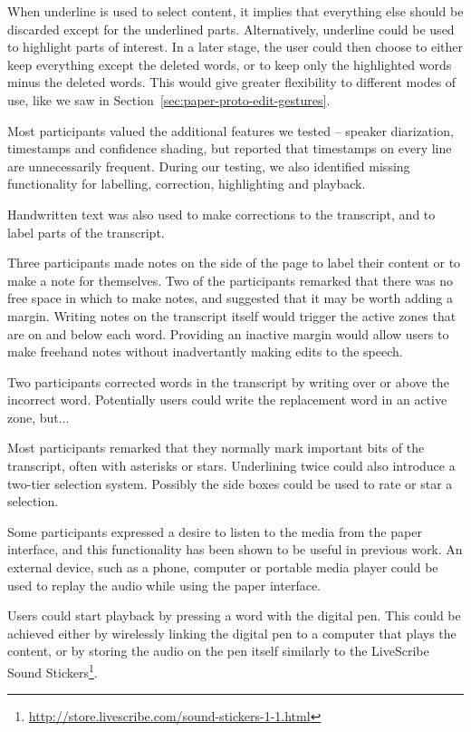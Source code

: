 When underline is used to select content, it implies that everything else should be discarded except for the underlined
parts. Alternatively, underline could be used to highlight parts of interest. In a later stage, the user could then
choose to either keep everything except the deleted words, or to keep only the highlighted words minus the deleted
words. This would give greater flexibility to different modes of use, like we saw in
Section~\ref{sec:paper-proto-edit-gestures}.

Most participants valued the additional features we tested -- speaker diarization, timestamps and confidence shading,
but reported that timestamps on every line are unnecessarily frequent. During our testing, we also identified missing
functionality for labelling, correction, highlighting and playback.

Handwritten text was also used to make
corrections to the transcript, and to label parts of the transcript.

Three participants made notes on the side of the page to label their content or to make a note for themselves. Two of
the participants remarked that there was no free space in which to make notes, and suggested that it may be worth
adding a margin. Writing notes on the transcript itself would trigger the active zones that are on and below each word.
Providing an inactive margin would allow users to make freehand notes without inadvertantly making edits to the speech.

Two participants corrected words in the transcript by writing over or above the incorrect word. 
Potentially users could write the replacement word in an active zone, but...

Most participants remarked that they normally mark important bits of the transcript, often with asterisks or
stars. Underlining twice could also introduce a two-tier selection system.
Possibly the side boxes could be used to rate or star a selection.

Some participants expressed a desire to listen to the media from the paper interface, and this functionality has been
shown to be useful in previous work. %
An external device, such as a phone, computer or portable media player could be used to replay the audio while using
the paper interface.

Users could start playback by pressing a word with the digital pen. This could be
achieved either by wirelessly linking the digital pen to a computer that plays the content, or by storing the audio on
the pen itself similarly to the LiveScribe Sound
Stickers\footnote{\url{http://store.livescribe.com/sound-stickers-1-1.html}}.

